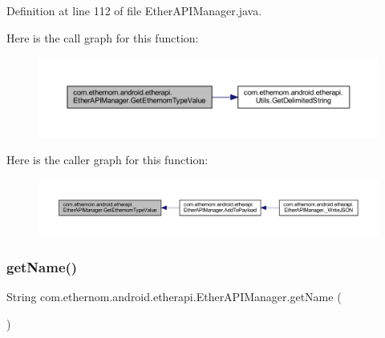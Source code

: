 Definition at line 112 of file Ether\+A\+P\+I\+Manager.\+java.

Here is the call graph for this function\+:\nopagebreak
\begin{figure}[H]
\begin{center}
\leavevmode
\includegraphics[width=350pt]{classcom_1_1ethernom_1_1android_1_1etherapi_1_1_ether_a_p_i_manager_ab888c8e041fe1ed3e6aabf931aa2cb57_cgraph}
\end{center}
\end{figure}
Here is the caller graph for this function\+:\nopagebreak
\begin{figure}[H]
\begin{center}
\leavevmode
\includegraphics[width=350pt]{classcom_1_1ethernom_1_1android_1_1etherapi_1_1_ether_a_p_i_manager_ab888c8e041fe1ed3e6aabf931aa2cb57_icgraph}
\end{center}
\end{figure}
\mbox{\label{classcom_1_1ethernom_1_1android_1_1etherapi_1_1_ether_a_p_i_manager_afe5d0f60a99c060f1c729be6198d0fed}} 
\subsubsection{\texorpdfstring{get\+Name()}{getName()}}
{\footnotesize\ttfamily String com.\+ethernom.\+android.\+etherapi.\+Ether\+A\+P\+I\+Manager.\+get\+Name (\begin{DoxyParamCaption}{ }\end{DoxyParamCaption})}



